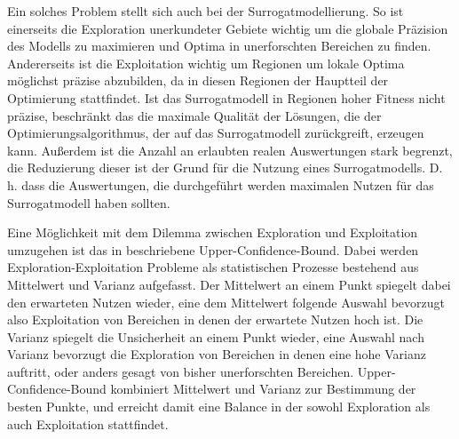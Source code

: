 Ein solches Problem stellt sich auch bei der Surrogatmodellierung.
So ist einerseits die Exploration unerkundeter Gebiete wichtig um die globale Präzision des Modells zu maximieren und Optima in unerforschten Bereichen zu finden.
Andererseits ist die Exploitation wichtig um Regionen um lokale Optima möglichst präzise abzubilden, da in diesen Regionen der Hauptteil der Optimierung stattfindet.
Ist das Surrogatmodell in Regionen hoher Fitness nicht präzise, beschränkt das die maximale Qualität der Lösungen, die der Optimierungsalgorithmus, der auf das Surrogatmodell zurückgreift, erzeugen kann.
Außerdem ist die Anzahl an erlaubten realen Auswertungen stark begrenzt, die Reduzierung dieser ist der Grund für die Nutzung eines Surrogatmodells.
D. h. dass die Auswertungen, die durchgeführt werden maximalen Nutzen für das Surrogatmodell haben sollten.

Eine Möglichkeit mit dem Dilemma zwischen Exploration und Exploitation umzugehen ist das in \cite{Auer.2002} beschriebene Upper-Confidence-Bound. Dabei werden Exploration-Exploitation Probleme als statistischen Prozesse bestehend aus Mittelwert und Varianz aufgefasst.
Der Mittelwert an einem Punkt spiegelt dabei den erwarteten Nutzen wieder, eine dem Mittelwert folgende Auswahl bevorzugt also Exploitation von Bereichen in denen der erwartete Nutzen hoch ist.
Die Varianz spiegelt die Unsicherheit an einem Punkt wieder, eine Auswahl nach Varianz bevorzugt die Exploration von Bereichen in denen eine hohe Varianz auftritt, oder anders gesagt von bisher unerforschten Bereichen.
Upper-Confidence-Bound kombiniert Mittelwert und Varianz zur Bestimmung der besten Punkte, und erreicht damit eine Balance in der sowohl Exploration als auch Exploitation stattfindet.


